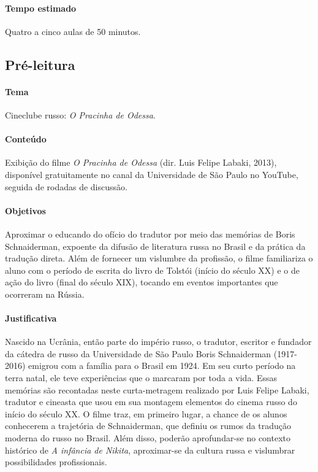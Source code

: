 \documentclass{article}
\begin{document}
\paragraph{Tempo estimado} Quatro a cinco aulas de 50 minutos.

\subsection{Pré-leitura}

\paragraph{Tema} Cineclube russo: \emph{O Pracinha de Odessa}.


\paragraph{Conteúdo}
Exibição do filme \emph{O Pracinha de Odessa} (dir. Luis Felipe Labaki,
2013), disponível gratuitamente no canal da Universidade de São Paulo no
YouTube, seguida de rodadas de discussão.

\paragraph{Objetivos}
Aproximar o educando do ofício do tradutor por meio das memórias de
Boris Schnaiderman, expoente da difusão de literatura russa no Brasil e
da prática da tradução direta. Além de fornecer um vislumbre da
profissão, o filme familiariza o aluno com o período de escrita do livro
de Tolstói (início do século XX) e o de ação do livro (final do século
XIX), tocando em eventos importantes que ocorreram na Rússia.

\paragraph{Justificativa}
Nascido na Ucrânia, então parte do império russo, o tradutor, escritor e
fundador da cátedra de russo da Universidade de São Paulo Boris
Schnaiderman (1917-2016) emigrou com a família para o Brasil em 1924. Em
seu curto período na terra natal, ele teve experiências que o marcaram
por toda a vida. Essas memórias são recontadas neste curta-metragem
realizado por Luis Felipe Labaki, tradutor e cineasta que usou em sua
montagem elementos do cinema russo do início do século XX. O filme traz,
em primeiro lugar, a chance de os alunos conhecerem a trajetória de
Schnaiderman, que definiu os rumos da tradução moderna do russo no
Brasil. Além disso, poderão aprofundar-se no contexto histórico de
\emph{A infância de Nikita}, aproximar-se da cultura russa e vislumbrar
possibilidades profissionais.
\end{document}
